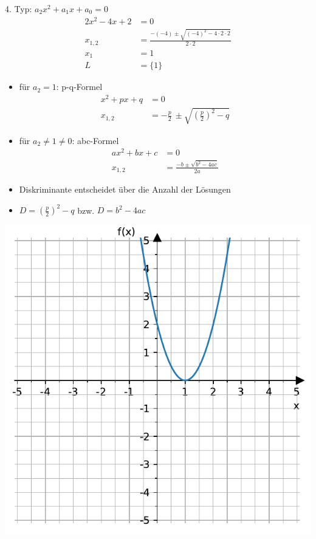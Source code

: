 \documentclass[
  ignorenonframetext,
  aspectratio=169,
]{beamer}
\begin{document}
\begin{frame}
\begin{block}{4. Typ: \(a_2 x^2+ a_1 x + a_0=0\)}
\label{typ-a_2-x2-a_1-x-a_00}
\[ \begin{aligned}
  2x^2-4x +2 &= 0\\
  x_{1, 2} &=\frac{-(-4)\pm \sqrt{(-4)^2-4\cdot 2 \cdot 2}}{2\cdot 2}\\
  x_1 &= 1\\
 L &= \{1\}
\end{aligned}
\]
\end{block}
\end{frame}

\begin{frame}
\begin{itemize}
\item
  für \(a_2=1\): p-q-Formel \[ \begin{aligned}
    x^2+px+q &= 0\\
    x_{1, 2}& = -\frac{p}{2}\ \pm \sqrt{\left(\frac{p}{2}\right)^2 - q}
    \end{aligned}
  \]
\item
  für \(a_2 \neq 1 \neq 0\): abc-Formel\\
  \[ \begin{aligned}
  ax^2+bx+c &= 0\\
  x_{1, 2} &= \frac{-b \pm \sqrt{b^2 - 4ac}}{2a}
  \end{aligned}
  \]
\item
  Diskriminante entscheidet über die Anzahl der Lösungen
\item
  \(D=\left(\frac{p}{2}\right)^2 - q\) bzw. \(D=b^2 - 4ac\)
\end{itemize}
\end{frame}

\begin{frame}
\includegraphics{3_Gleichungen_files/figure-beamer/cell-5-output-1.pdf}
\end{frame}
\end{document}
